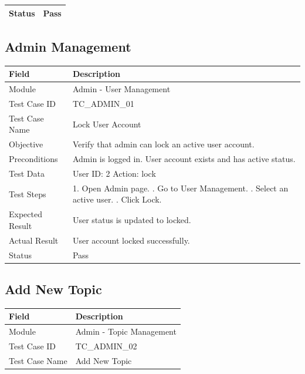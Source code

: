 \documentclass[12pt,a4paper]{article}
\begin{document}
{{\begin{table}[H]
\begin{tabular}{|p{4cm}|p{10cm}|}
		Status &
		Pass \\
		\hline
		
	\end{tabular}

\end{table}
\subsection{Admin Management}
\begin{longtable}{|p{4cm}|p{10cm}|}
	\hline
	\textbf{Field} & \textbf{Description} \\ \hline
	Module & Admin - User Management \\ \hline
	Test Case ID & TC\_ADMIN\_01 \\ \hline
	Test Case Name & Lock User Account \\ \hline
	Objective & Verify that admin can lock an active user account. \\ \hline
	Preconditions & Admin is logged in. User account exists and has active status. \\ \hline
	Test Data & User ID: 2 \newline Action: lock \\ \hline
	Test Steps &
	1. Open Admin page. \newline
	2. Go to User Management. \newline
	3. Select an active user. \newline
	4. Click Lock. \\ \hline
	Expected Result & User status is updated to locked. \\ \hline
	Actual Result & User account locked successfully. \\ \hline
	Status & Pass \\ \hline
\end{longtable}
\subsection{Add New Topic}
\begin{longtable}{|p{4cm}|p{10cm}|}
	\hline
	\textbf{Field} & \textbf{Description} \\ \hline
	
	Module & Admin - Topic Management \\ \hline
	
	Test Case ID & TC\_ADMIN\_02 \\ \hline
	
	Test Case Name & Add New Topic \\ \hline
	

\end{longtable}}}
\end{document}
